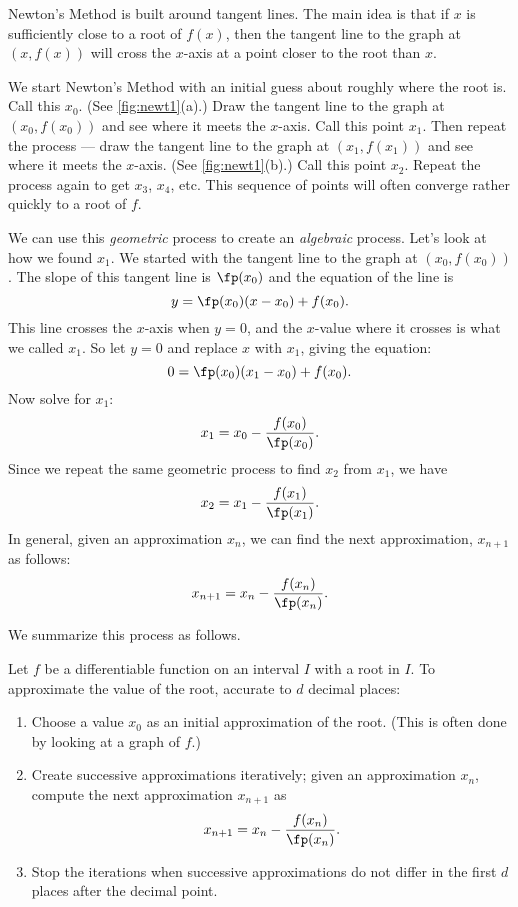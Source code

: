 Newton's Method is built around tangent lines.  The main idea is that if $x$ is sufficiently close to a root of $f(x)$, then the  tangent line to the graph at $(x,f(x))$ will cross the $x$-axis at a point closer to the root than $x$.  

We start Newton's Method with an initial guess about roughly where the root is.  Call this $x_0$. (See \autoref{fig:newt1}(a).)  Draw the tangent line to the graph at $(x_0,f(x_0))$ and see where it meets the $x$-axis. Call this point $x_1$.  Then repeat the process --- draw the tangent line to the graph at $(x_1, f(x_1))$ and see where it meets the $x$-axis. (See \autoref{fig:newt1}(b).) Call this point $x_2$.  Repeat the process again to get $x_3$, $x_4$, etc.  This sequence of points will often converge rather quickly to a root of $f$.  

We can use this \emph{geometric} process to create an \emph{algebraic} process.  Let's look at how we found $x_1$.  We started with the tangent line to the graph at $(x_0,f(x_0))$.  The slope of this tangent line is $\fp(x_0)$ and the equation of the line is
\[y=\fp(x_0)(x-x_0)+f(x_0).\]
This line crosses the $x$-axis when $y=0$, and the $x$-value where it crosses is what we called $x_1$. So let $y=0$ and replace $x$ with $x_1$, giving the equation: 
\[ 0 = \fp(x_0)(x_1-x_0)+f(x_0).\] 
Now solve for $x_1$:
\[x_1=x_0-\frac{f(x_0)}{\fp(x_0)}.\]
Since we repeat the same geometric process to find $x_2$ from $x_1$, we have
\[x_2=x_1-\frac{f(x_1)}{\fp(x_1)}.\]
In general, given an approximation $x_n$, we can find the next approximation, $x_{n+1}$ as follows:
\[x_{n+1} = x_{n} - \frac{f(x_{n})}{\fp(x_{n})}.\]

We summarize this process as follows.

\begin{keyidea}\label{idea:Newton}%
Let $f$ be a differentiable function on an interval $I$ with a root in $I$. To approximate the value of the root, accurate to $d$ decimal places:
\begin{enumerate}
	\item		Choose a value $x_0$ as an initial approximation of the root. (This is often done by looking at a graph of $f$.)
	\item		Create successive approximations iteratively; given an approximation $x_n$, compute the next approximation $x_{n+1}$ as
	\[x_{n+1} = x_n - \frac{f(x_n)}{\fp(x_n)}.\]
	\item		Stop the iterations when successive approximations do not differ in the first $d$ places after the decimal point.
\end{enumerate}
\end{keyidea}

